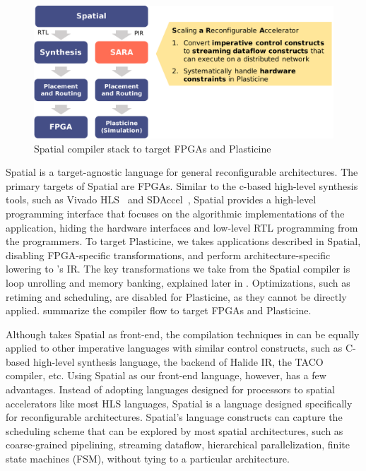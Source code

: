 \begin{figure}
\centering
\includegraphics[width=1\textwidth]{figs/spatialstack.pdf}
\caption[Spatial compiler stack to target FPGAs and Plasticine]{
  Spatial compiler stack to target FPGAs and Plasticine
}
\label{fig:spatialstack}
\end{figure}

Spatial is a target-agnostic language for general reconfigurable architectures. 
The primary targets of Spatial are FPGAs.
Similar to the c-based high-level synthesis tools, such as Vivado HLS~\cite{vivado} and
SDAccel~\cite{sdaccel},
Spatial provides a high-level programming interface that focuses on the algorithmic 
implementations of the application, hiding the hardware interfaces and low-level RTL programming from the
programmers.
To target Plasticine, we takes applications described in Spatial, disabling FPGA-specific
transformations, and perform architecture-specific lowering to \name's IR.
The key transformations we take from the Spatial compiler is loop unrolling and memory banking,
explained later in .
Optimizations, such as retiming and scheduling, are disabled for Plasticine, as they cannot be
directly applied.
 summarize the compiler flow to target FPGAs and Plasticine.

Although \name takes Spatial as front-end, the compilation techniques in \name can be equally
applied to other imperative languages with similar control constructs, such as C-based high-level
synthesis language, the backend of Halide IR, the TACO compiler, etc.
Using Spatial as our front-end language, however, has a few advantages.
Instead of adopting languages designed for processors to spatial accelerators like most HLS languages, 
Spatial is a language designed specifically for reconfigurable architectures.
Spatial's language constructs can capture the scheduling scheme that can be explored by most
spatial architectures, such as coarse-grained pipelining, streaming dataflow, hierarchical parallelization, 
finite state machines (FSM), without tying to a particular architecture.

